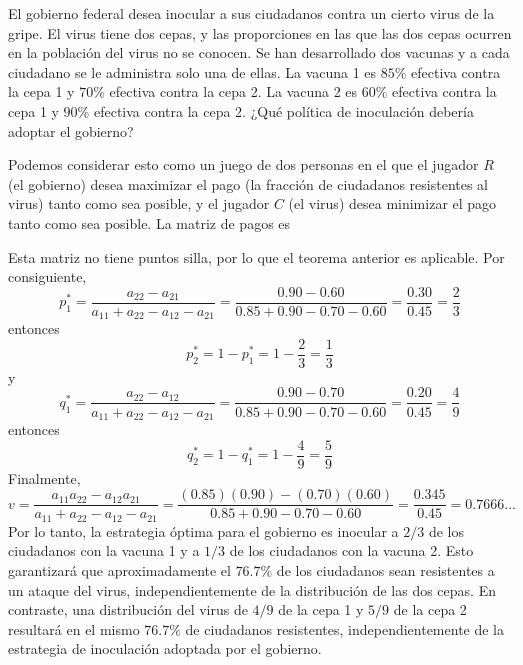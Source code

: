 \begin{examplebox}{}{}
    El gobierno federal desea inocular a sus ciudadanos contra un cierto virus de la gripe. El virus tiene dos cepas, y las proporciones en las que las dos cepas ocurren en la población del virus no se conocen. Se han desarrollado dos vacunas y a cada ciudadano se le administra solo una de ellas. La vacuna 1 es $85\%$ efectiva contra la cepa 1 y $70\%$ efectiva contra la cepa 2. La vacuna 2 es $60\%$ efectiva contra la cepa 1 y $90\%$ efectiva contra la cepa 2. ¿Qué política de inoculación debería adoptar el gobierno?

    \tcblower
    \solucion Podemos considerar esto como un juego de dos personas en el que el jugador $R$ (el gobierno) desea maximizar el pago (la fracción de ciudadanos resistentes al virus) tanto como sea posible, y el jugador $C$ (el virus) desea minimizar el pago tanto como sea posible. La matriz de pagos es
    \begin{matrizn}
    \end{matrizn}
    Esta matriz no tiene puntos silla, por lo que el teorema anterior es aplicable. Por consiguiente,
    $$p_1^* = \frac{a_{22} - a_{21}}{a_{11} + a_{22} - a_{12} - a_{21}} = \frac{0.90 - 0.60}{0.85 + 0.90 - 0.70 - 0.60} = \frac{0.30}{0.45} = \frac{2}{3}$$
    entonces
    $$p_2^* = 1 - p_1^* = 1 - \frac{2}{3} = \frac{1}{3}$$
    y
    $$q_1^* = \frac{a_{22} - a_{12}}{a_{11} + a_{22} - a_{12} - a_{21}} = \frac{0.90 - 0.70}{0.85 + 0.90 - 0.70 - 0.60} = \frac{0.20}{0.45} = \frac{4}{9}$$
    entonces
    $$ q_2^* = 1 - q_1^* = 1 - \frac{4}{9} = \frac{5}{9}$$
    Finalmente,
    $$v = \frac{a_{11}a_{22} - a_{12}a_{21}}{a_{11} + a_{22} - a_{12} - a_{21}} = \frac{(0.85)(0.90) - (0.70)(0.60)}{0.85 + 0.90 - 0.70 - 0.60} = \frac{0.345}{0.45} = 0.7666\dots$$
    Por lo tanto, la estrategia óptima para el gobierno es inocular a $2/3$ de los ciudadanos con la vacuna 1 y a $1/3$ de los ciudadanos con la vacuna 2. Esto garantizará que aproximadamente el $76.7\%$ de los ciudadanos sean resistentes a un ataque del virus, independientemente de la distribución de las dos cepas. En contraste, una distribución del virus de $4/9$ de la cepa 1 y $5/9$ de la cepa 2 resultará en el mismo $76.7\%$ de ciudadanos resistentes, independientemente de la estrategia de inoculación adoptada por el gobierno.
\end{examplebox}


